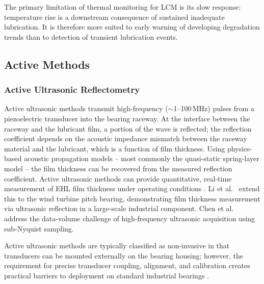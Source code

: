The primary limitation of thermal monitoring for LCM is its slow response: temperature rise is a downstream consequence of sustained inadequate lubrication. It is therefore more suited to early warning of developing degradation trends than to detection of transient lubrication events.

\subsection{Active Methods}
\label{subsec:active}

\subsubsection{Active Ultrasonic Reflectometry}
\label{subsubsec:ultrasonic_active}
Active ultrasonic methods transmit high-frequency ($\sim$1--100\,MHz) pulses from a piezoelectric transducer into the bearing raceway. At the interface between the raceway and the lubricant film, a portion of the wave is reflected; the reflection coefficient depends on the acoustic impedance mismatch between the raceway material and the lubricant, which is a function of film thickness. Using physics-based acoustic propagation models -- most commonly the quasi-static spring-layer model \cite{drinkwater_ultrasonic_2009} -- the film thickness can be recovered from the measured reflection coefficient. Active ultrasonic methods can provide quantitative, real-time measurement of EHL film thickness under operating conditions \cite{dwyer-joyce_measurement_2003,zhang_ultrasonic_2015,chen_evaluation_2023,wu_ultrasonic_2025}. Li et al.\ \cite{li_lubrication_2026} extend this to the wind turbine pitch bearing, demonstrating film thickness measurement via ultrasonic reflection in a large-scale industrial component. Chen et al.\ \cite{chen_sub-nyquist_2025} address the data-volume challenge of high-frequency ultrasonic acquisition using sub-Nyquist sampling.

Active ultrasonic methods are typically classified as non-invasive in that transducers can be mounted externally on the bearing housing; however, the requirement for precise transducer coupling, alignment, and calibration creates practical barriers to deployment on standard industrial bearings \cite{hansen_comparison_2022,wang_accuracy-improved_2024}.

